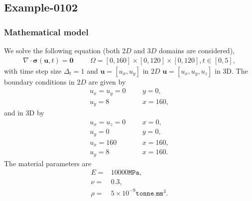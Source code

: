 %
\clearpage
%
\subsection{Example-0102}
%
%
\subsubsection{Mathematical model}
%
We solve the following equation (both $2D$ and $3D$ domains are considered),
%
\begin{align}
    \nabla \cdot \boldsymbol{\sigma} (\boldsymbol{u}, t) = \boldsymbol{0} & &&\Omega = [0, 160] \times [0, 120] \times [0, 120], t \in [0, 5],
\end{align}
%
with time step size $\Delta_t = 1$ and $\boldsymbol{u} = [u_x,u_y]$ in $2D$ $\boldsymbol{u} = [u_x,u_y,u_z]$ in 3D. The boundary conditions in $2D$ are given by
%
\begin{align}
    u_x = u_y = 0 & &&y = 0, \\
		u_y = 8 & &&x = 160,
\end{align}
%
and in 3D by
\begin{align}
    u_x = u_z = 0 & &&x = 0, \\
    u_y = 0 & &&y = 0, \\
		u_x = 160 & &&x = 160, \\
		u_y = 8 & &&x = 160.
\end{align}
The material parameters are
\begin{align}
    E = & 10000\texttt{MPa}, \\
    \nu = & 0.3, \\
		\rho = & 5 \times 10^{-9}\texttt{tonne.mm$^3$}.
\end{align}
%
%
